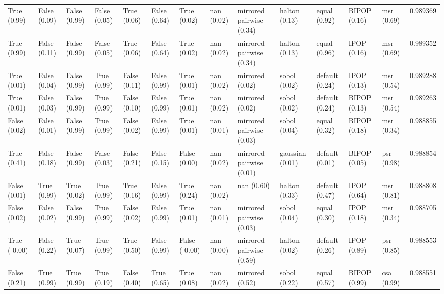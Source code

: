 \begin{tabular}{lllllllllllllr}
True (0.99) & False (0.09) & False (0.99) & False (0.05) & True (0.06) & False (0.64) & True (0.02) & nan (0.02) & mirrored pairwise (0.34) & halton (0.13) & equal (0.92) & BIPOP (0.16) & msr (0.69) & 0.989369 \\
True (0.99) & False (0.11) & False (0.99) & False (0.05) & True (0.06) & False (0.64) & True (0.02) & nan (0.02) & mirrored pairwise (0.34) & halton (0.13) & equal (0.96) & IPOP (0.16) & msr (0.69) & 0.989352 \\
True (0.01) & False (0.04) & False (0.99) & True (0.99) & False (0.11) & False (0.99) & True (0.01) & nan (0.02) & mirrored (0.02) & sobol (0.02) & default (0.24) & IPOP (0.13) & msr (0.54) & 0.989288 \\
True (0.01) & False (0.03) & False (0.99) & True (0.99) & False (0.10) & False (0.99) & True (0.01) & nan (0.02) & mirrored (0.02) & sobol (0.02) & default (0.24) & BIPOP (0.13) & msr (0.54) & 0.989263 \\
False (0.02) & False (0.01) & False (0.99) & True (0.99) & False (0.02) & False (0.99) & True (0.01) & nan (0.01) & mirrored pairwise (0.03) & sobol (0.04) & equal (0.32) & BIPOP (0.18) & msr (0.34) & 0.988855 \\
True (0.41) & False (0.18) & False (0.99) & False (0.03) & False (0.21) & False (0.15) & False (0.00) & nan (0.02) & mirrored pairwise (0.01) & gaussian (0.01) & default (0.01) & BIPOP (0.05) & psr (0.98) & 0.988854 \\
False (0.01) & True (0.99) & True (0.02) & True (0.99) & True (0.16) & False (0.99) & True (0.24) & nan (0.02) & nan (0.60) & halton (0.33) & default (0.47) & IPOP (0.64) & msr (0.81) & 0.988808 \\
False (0.02) & False (0.02) & False (0.99) & True (0.99) & False (0.02) & False (0.99) & True (0.01) & nan (0.01) & mirrored pairwise (0.03) & sobol (0.04) & equal (0.30) & IPOP (0.18) & msr (0.34) & 0.988705 \\
True (-0.00) & False (0.22) & True (0.07) & True (0.99) & True (0.50) & False (0.99) & False (-0.00) & nan (0.00) & mirrored pairwise (0.59) & halton (0.02) & default (0.26) & IPOP (0.89) & psr (0.85) & 0.988553 \\
False (0.21) & True (0.99) & True (0.99) & True (0.19) & False (0.40) & True (0.65) & True (0.08) & nan (0.02) & mirrored (0.52) & sobol (0.22) & equal (0.57) & BIPOP (0.99) & csa (0.99) & 0.988551 \\
\bottomrule
\end{tabular}
